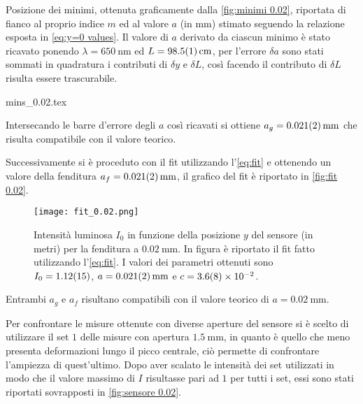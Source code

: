 \documentclass[../main.tex]{subfiles}
\begin{document}
\begin{table}[ht!]
    \centering
    \caption{Posizione dei minimi, ottenuta graficamente dalla \autoref{fig:minimi 0.02}, riportata di fianco al proprio indice $m$ ed al valore $a$ (in $\si{\mm}$) stimato seguendo la relazione esposta in \autoref{eq:y=0 values}. Il valore di $a$ derivato da ciascun minimo è stato ricavato ponendo $\lambda = \qty{650}{\nm}$ ed $L = \qty{98.5+-0.1}{\cm}$, per l'errore $\delta a$ sono stati sommati in quadratura i contributi di $\delta y$ e $\delta L$, così facendo il contributo di $\delta L$ risulta essere trascurabile.} %
    {mins_0.02.tex}
    \label{tab:minimi 0.02}
\end{table}

Intersecando le barre d'errore degli $a$ così ricavati si ottiene $a_g = \qty{0.021+-0.002}{\mm}$ che risulta compatibile con il valore teorico.


Successivamente si è proceduto con il fit utilizzando l'\autoref{eq:fit} e ottenendo un valore della fenditura $a_f = \qty{0.021+-0.002}{\mm}$, il grafico del fit è riportato in \autoref{fig:fit 0.02}.

\begin{figure}[ht!]
    \centering
    \texttt{[image: fit\_0.02.png]}
    \caption{Intensità luminosa $I_{0}$ in funzione della posizione $y$ del sensore (in metri) per la fenditura a $\qty{0.02}{\mm}$. In figura è riportato il fit fatto utilizzando l'\autoref{eq:fit}. I valori dei parametri ottenuti sono $I_{0} = \num{1.12+-0.15}$, $a = \qty{0.021+-0.002}{\mm}$ e $c = \num{3.6+-0.8e-2}$.}
    \label{fig:fit 0.02}
\end{figure}

Entrambi $a_g$ e $a_f$ risultano compatibili con il valore teorico di $a = \qty{0.02}{\mm}$.

Per confrontare le misure ottenute con diverse aperture del sensore si è scelto di utilizzare il set $1$ delle misure con apertura $\qty{1.5}{\mm}$, in quanto è quello che meno presenta deformazioni lungo il picco centrale, ciò permette di confrontare l'ampiezza di quest'ultimo. Dopo aver scalato le intensità dei set utilizzati in modo che il valore massimo di $I$ risultasse pari ad $1$ per tutti i set, essi sono stati riportati sovrapposti in \autoref{fig:sensore 0.02}.
\end{document}
